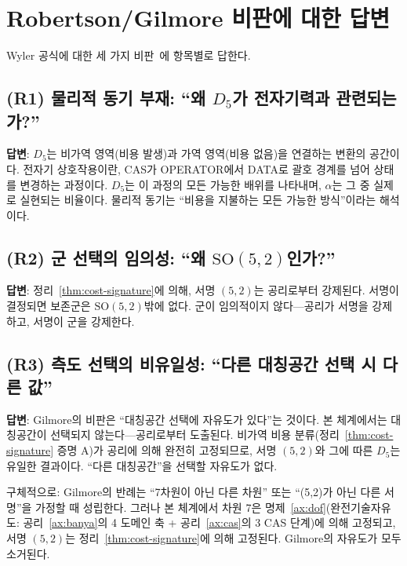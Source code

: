 \documentclass[entropy,article,submit,pdftex,oneauthor]{Definitions/mdpi}
\begin{document}
\section{Robertson/Gilmore 비판에 대한 답변}
\label{sec:robertson}

Wyler 공식에 대한 세 가지 비판~\cite{robertson1971,gilmore1972}에 항목별로 답한다.

\subsection{(R1) 물리적 동기 부재: ``왜 $D_5$가 전자기력과 관련되는가?''~\cite{robertson1971}}

\textbf{답변}: $D_5$는 비가역 영역(비용 발생)과 가역 영역(비용 없음)을 연결하는 변환의 공간이다. 전자기 상호작용이란, CAS가 OPERATOR에서 DATA로 괄호 경계를 넘어 상태를 변경하는 과정이다. $D_5$는 이 과정의 모든 가능한 배위를 나타내며, $\alpha$는 그 중 실제로 실현되는 비율이다. 물리적 동기는 ``비용을 지불하는 모든 가능한 방식''이라는 해석이다.

\subsection{(R2) 군 선택의 임의성: ``왜 $\mathrm{SO}(5,2)$인가?''~\cite{robertson1971}}

\textbf{답변}: 정리~\ref{thm:cost-signature}에 의해, 서명 $(5,2)$는 공리로부터 강제된다. 서명이 결정되면 보존군은 $\mathrm{SO}(5,2)$밖에 없다. 군이 임의적이지 않다---공리가 서명을 강제하고, 서명이 군을 강제한다.

\subsection{(R3) 측도 선택의 비유일성: ``다른 대칭공간 선택 시 다른 값''~\cite{gilmore1972}}

\textbf{답변}: Gilmore의 비판은 ``대칭공간 선택에 자유도가 있다''는 것이다. 본 체계에서는 대칭공간이 선택되지 않는다---공리로부터 도출된다. 비가역 비용 분류(정리~\ref{thm:cost-signature} 증명 A)가 공리에 의해 완전히 고정되므로, 서명 $(5,2)$와 그에 따른 $D_5$는 유일한 결과이다. ``다른 대칭공간''을 선택할 자유도가 없다.

구체적으로: Gilmore의 반례는 ``7차원이 아닌 다른 차원'' 또는 ``(5,2)가 아닌 다른 서명''을 가정할 때 성립한다. 그러나 본 체계에서 차원 7은 명제~\ref{ax:dof}(완전기술자유도: 공리~\ref{ax:banya}의 4 도메인 축 + 공리~\ref{ax:cas}의 3 CAS 단계)에 의해 고정되고, 서명 $(5,2)$는 정리~\ref{thm:cost-signature}에 의해 고정된다. Gilmore의 자유도가 모두 소거된다.
\end{document}
